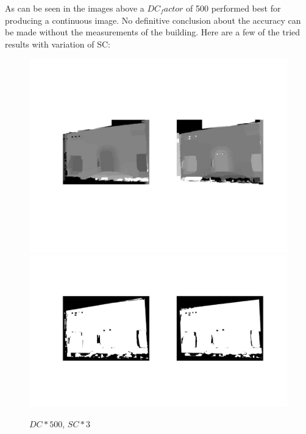 \documentclass[12pt]{article}
\begin{document}
As can be seen in the images above a $DC_factor$ of 500 performed best for producing a continuous image. No definitive conclusion about the accuracy can be made without the measurements of the building.
\vspace{5mm}
\newline
Here are a few of the tried results with variation of SC: 
\vspace{5mm}
\begin{figure}[H]
	\centering
	\includegraphics[width=1.1\textwidth]{gc_500_3_1.jpg}
	\includegraphics[width=1.1\textwidth]{gc_500_3_2.jpg}
	\caption{$DC*500$, $SC*3$}
	\label{fig1}
\end{figure}
\vspace{5mm}
\end{document}
